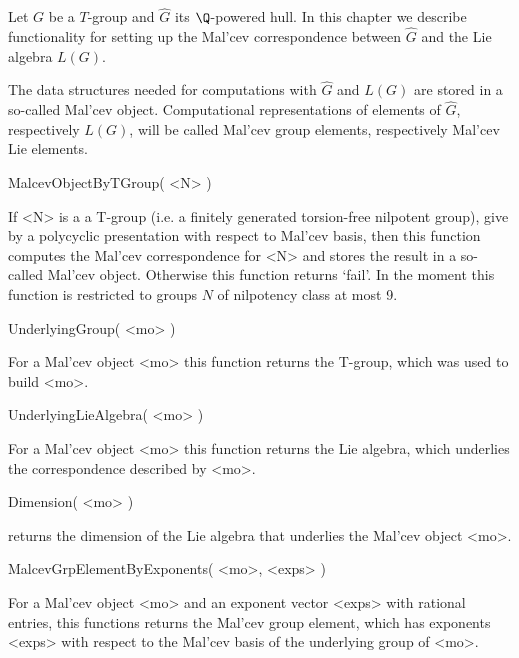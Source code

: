 


Let $G$ be a $T$-group
and $\hat{G}$ its $\Q$-powered hull.
In this chapter we describe functionality 
for setting up the 
Mal'cev correspondence
between $\hat{G}$ and the Lie algebra $L(G)$.

The data structures needed for computations with $\hat{G}$ and 
$L(G)$ are 
stored in a so-called Mal'cev object.
Computational representations of 
elements of $\hat{G}$, respectively $L(G)$, 
will be called Mal'cev group elements, respectively 
Mal'cev Lie elements.

\> MalcevObjectByTGroup( <N> )

If <N> is a a T-group 
(i.e. a finitely generated torsion-free nilpotent group),
give by a polycyclic presentation with respect to Mal'cev basis,
then this function computes the Mal'cev correspondence for <N> 
and stores the result in a so-called Mal'cev object. 
Otherwise this function returns `fail'.
In the moment this function is restricted to groups $N$
of nilpotency class at most 9.

\> UnderlyingGroup( <mo> )

For a Mal'cev object <mo> this function returns the T-group,
which was used to build <mo>.

\> UnderlyingLieAlgebra( <mo> )

For a Mal'cev object <mo> this function returns the Lie algebra,
which underlies the correspondence described by <mo>.

\> Dimension( <mo> )

returns the dimension of the Lie algebra that underlies the Mal'cev object <mo>.

\> MalcevGrpElementByExponents( <mo>, <exps> )

For a Mal'cev object <mo> and an exponent vector <exps> with rational 
entries, this functions returns the Mal'cev group element, which 
has exponents <exps> with respect to the Mal'cev basis of the underlying
group of <mo>.

